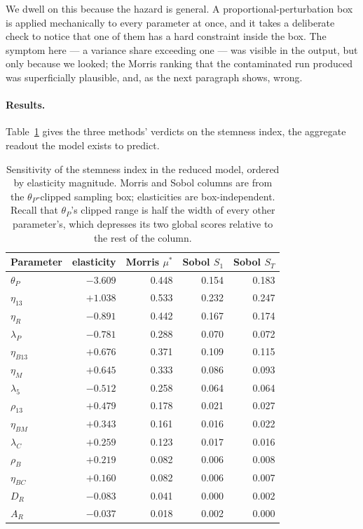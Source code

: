 \documentclass[11pt]{article}
\newcommand{\thP}{\theta_P}
\begin{document}
We dwell on this because the hazard is general. A proportional-perturbation box
is applied mechanically to every parameter at once, and it takes a deliberate
check to notice that one of them has a hard constraint inside the box. The
symptom here --- a variance share exceeding one --- was visible in the output,
but only because we looked; the Morris ranking that the contaminated run
produced was superficially plausible, and, as the next paragraph shows, wrong.

\paragraph{Results.} Table~\ref{tab:sa7} gives the three methods' verdicts on
the stemness index, the aggregate readout the model exists to predict.

\begin{table}[H]
\centering
\begin{tabular}{lrrrr}
\toprule
\textbf{Parameter} & \textbf{elasticity} & \textbf{Morris $\mu^*$} &
\textbf{Sobol $S_1$} & \textbf{Sobol $S_T$} \\
\midrule
$\thP$        & $-3.609$ & 0.448 & 0.154 & 0.183 \\
$\eta_{13}$   & $+1.038$ & 0.533 & 0.232 & 0.247 \\
$\eta_R$      & $-0.891$ & 0.442 & 0.167 & 0.174 \\
$\lambda_P$   & $-0.781$ & 0.288 & 0.070 & 0.072 \\
$\eta_{B13}$  & $+0.676$ & 0.371 & 0.109 & 0.115 \\
$\eta_M$      & $+0.645$ & 0.333 & 0.086 & 0.093 \\
$\lambda_5$   & $-0.512$ & 0.258 & 0.064 & 0.064 \\
$\rho_{13}$   & $+0.479$ & 0.178 & 0.021 & 0.027 \\
$\eta_{BM}$   & $+0.343$ & 0.161 & 0.016 & 0.022 \\
$\lambda_C$   & $+0.259$ & 0.123 & 0.017 & 0.016 \\
$\rho_B$      & $+0.219$ & 0.082 & 0.006 & 0.008 \\
$\eta_{BC}$   & $+0.160$ & 0.082 & 0.006 & 0.007 \\
$D_R$         & $-0.083$ & 0.041 & 0.000 & 0.002 \\
$A_R$         & $-0.037$ & 0.018 & 0.002 & 0.000 \\
\bottomrule
\end{tabular}
\caption{Sensitivity of the stemness index in the reduced model, ordered by
elasticity magnitude. Morris and Sobol columns are from the $\thP$-clipped
sampling box; elasticities are box-independent. Recall that $\thP$'s clipped
range is half the width of every other parameter's, which depresses its two
global scores relative to the rest of the column.}
\label{tab:sa7}
\end{table}
\end{document}
